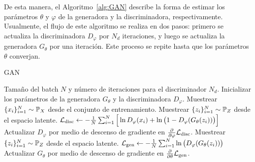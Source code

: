 {{De esta manera, el Algoritmo~\ref*{alg:GAN} describe la forma de estimar los parámetros $\theta$ y $\varphi$ de la generadora y la discriminadora, respectivamente. Usualmente, el flujo de este algoritmo se realiza en dos pasos: primero se actualiza la discriminadora $D_\varphi$ por $N_d$ iteraciones, y luego se actualiza la generadora $G_\theta$ por una iteración. Este proceso se repite hasta que los parámetros $\theta$ converjan.
\begin{algorithm}[tbhp]
    \caption{GAN}\label{alg:GAN}
    \begin{algorithmic}
        \Require Tamaño del batch $N$ y número de iteraciones para el discriminador $N_d$.
        \State Inicializar los parámetros de la generadora $G_\theta$ y la discriminadora $D_\varphi$.
        \State Muestrear $\{x_i\}_{i=1}^{N} \sim \Prob_X$ desde el conjunto de entrenamiento.
        \State Muestrear $\{z_i\}_{i=1}^{N} \sim \Prob_Z$ desde el espacio latente.
        \State $\cL_{\mathrm{disc}} \gets -\frac{1}{N}\sum_{i=1}^{N} \Big[ \ln D_\varphi(x_i) + \ln \qty\big(1 - D_\varphi(G_\theta(z_i))) \Big]$
        \State Actualizar $D_\varphi$ por medio de descenso de gradiente en $\pdv{\varphi} \cL_{\mathrm{disc}}$.
        \EndFor
        \State Muestrear $\{z_i\}_{i=1}^{N} \sim \Prob_Z$ desde el espacio latente.
        \State $\cL_{\mathrm{gen}} \gets - \frac{1}{N}\sum_{i=1}^{N} \ln \qty\big(D_\varphi(G_\theta(z_i)))$
        \State Actualizar $G_\theta$ por medio de descenso de gradiente en $\pdv{\theta} \mathcal{L}_{\mathrm{gen}}$.
        \EndWhile
    \end{algorithmic}
\end{algorithm}

}}
